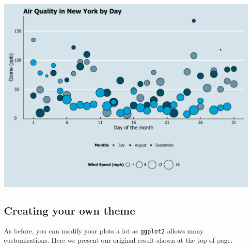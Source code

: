 \documentclass[]{article}
\begin{document}
\begin{center}\includegraphics{0_all_posts_pdf/wscatter_19-1} \end{center}

\subsection{Creating your own theme}\label{creating-your-own-theme-5}

As before, you can modify your plots a lot as \texttt{ggplot2} allows
many customisations. Here we present our original result shown at the
top of page.
\end{document}
